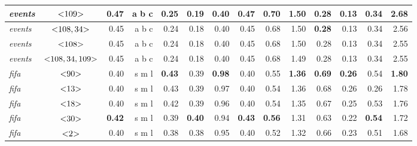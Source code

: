 \documentclass[runningheads,a4paper]{llncs}
\begin{document}
\begin{table}
\begin{tabularx}{\textwidth}{l@{}c@{}R@{}R@{}R@{}R@{}R@{}R@{}R@{}R@{}R@{}R@{}R@{}R@{}}
        \midrule
    \textit{events}   & $\text{\textless} 109\text{\textgreater}$ & \textbf{0.47} & a \text{\textless} b \text{\textless} c & 0.25 & \textbf{0.19} & 0.40 & \textbf{0.47} & 0.70 & 1.50 & 0.28 & 0.13 & 0.34 & 2.68 \\
        \midrule
    \textit{events}   & $\text{\textless} 108,34\text{\textgreater}$ & 0.45 & a \text{\textless} b \text{\textless} c & 0.24 & 0.18 & 0.40 & 0.45 & 0.68 & 1.50 & \textbf{0.28} & 0.13 & 0.34 & 2.56 \\
        \midrule
    \textit{events}   & $\text{\textless} 108\text{\textgreater}$  & 0.45 & a \text{\textless} b \text{\textless} c & 0.24 & 0.18 & 0.40 & 0.45 & 0.68 & 1.50 & 0.28 & 0.13 & 0.34 & 2.55 \\
        \midrule
    \textit{events}   & $\text{\textless} 108,34,109\text{\textgreater}$ & 0.45 & a \text{\textless} b \text{\textless} c & 0.24 & 0.18 & 0.40 & 0.45 & 0.68 & 1.49 & 0.28 & 0.13 & 0.34 & 2.55 \\
	    \midrule
	    \midrule
	\textit{fifa} & $\text{\textless} 90\text{\textgreater}$ & 0.40 & s \text{\textless} m \text{\textless} l & \textbf{0.43} & 0.39 & \textbf{0.98} & 0.40 & 0.55 & \textbf{1.36} & \textbf{0.69} & \textbf{0.26} & 0.54 & \textbf{1.80} \\
	    \midrule
    	\textit{fifa} & $\text{\textless} 13\text{\textgreater}$ & 0.40 & s \text{\textless} m \text{\textless} l & 0.43 & 0.39 & 0.97 & 0.40 & 0.54 & 1.36 & 0.68 & 0.26 & 0.26 & 1.78 \\
    	    \midrule
    \textit{fifa} & $\text{\textless} 18\text{\textgreater}$ & 0.40 & s \text{\textless} m \text{\textless} l & 0.42 & 0.39 & 0.96 & 0.40 & 0.54 & 1.35 & 0.67 & 0.25 & 0.53 & 1.76 \\
        \midrule
    \textit{fifa} & $\text{\textless} 30\text{\textgreater}$ & \textbf{0.42} & s \text{\textless} m \text{\textless} l & 0.39 & \textbf{0.40} & 0.94 & \textbf{0.43} & \textbf{0.56} & 1.31 & 0.63 & 0.22 & \textbf{0.54} & 1.72 \\
        \midrule
    \textit{fifa} & $\text{\textless} 2\text{\textgreater}$ & 0.40 & s \text{\textless} m \text{\textless} l & 0.38 & 0.38 & 0.95 & 0.40 & 0.52 & 1.32 & 0.66 & 0.23 & 0.51 & 1.68 \\
        \bottomrule
    \end{tabularx}%
  \label{tab:results}%
\end{table}%
\end{document}
